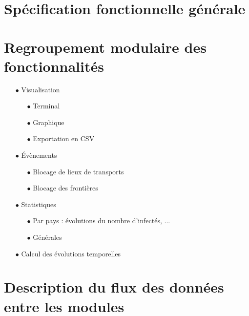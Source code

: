\documentclass[12pt,a4paper]{report}
\begin{document}
\section*{Spécification fonctionnelle générale}

\section*{Regroupement modulaire des fonctionnalités}
\begin{flushleft}
	\begin{itemize}
		\item[$\bullet$] Visualisation
			\begin{itemize}
				\item[$\bullet$] Terminal
				\item[$\bullet$] Graphique
				\item[$\bullet$] Exportation en CSV
			\end{itemize}
		\item[$\bullet$] Évènements
			\begin{itemize}
				\item[$\bullet$] Blocage de lieux de transports
				\item[$\bullet$] Blocage des frontières
			\end{itemize}
		\item[$\bullet$] Statistiques
			\begin{itemize}
				\item[$\bullet$] Par pays : évolutions du nombre d'infectés, ...
				\item[$\bullet$] Générales
			\end{itemize}
		\item[$\bullet$] Calcul des évolutions temporelles
	\end{itemize}
\end{flushleft}

\section*{Description du flux des données entre les modules}
\end{document}
